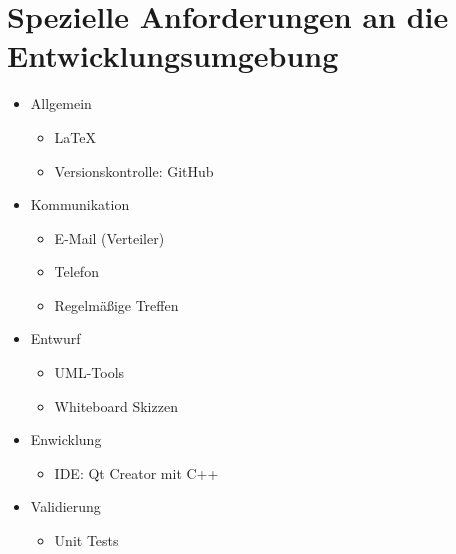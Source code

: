 \section{Spezielle Anforderungen an die Entwicklungsumgebung}

\begin{itemize}
  \item Allgemein
    \begin{itemize}
      \item \LaTeX
      \item Versionskontrolle: GitHub
    \end{itemize}
  \item Kommunikation
    \begin{itemize}
      \item E-Mail (Verteiler)
      \item Telefon
      \item Regelmäßige Treffen
    \end{itemize}
  \item Entwurf
    \begin{itemize}
      \item UML-Tools
      \item Whiteboard Skizzen
    \end{itemize}
  \item Enwicklung
    \begin{itemize}
      \item IDE: Qt Creator mit C++
    \end{itemize}
  \item Validierung
    \begin{itemize}
      \item Unit Tests
    \end{itemize}
\end{itemize}

